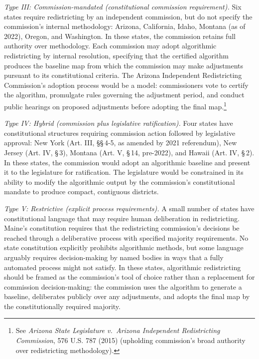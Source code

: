 \textit{Type III: Commission-mandated (constitutional commission requirement).} Six states require redistricting by an independent commission, but do not specify the commission's internal methodology: Arizona, California, Idaho, Montana (as of 2022), Oregon, and Washington. In these states, the commission retains full authority over methodology. Each commission may adopt algorithmic redistricting by internal resolution, specifying that the certified algorithm produces the baseline map from which the commission may make adjustments pursuant to its constitutional criteria. The Arizona Independent Redistricting Commission's adoption process would be a model: commissioners vote to certify the algorithm, promulgate rules governing the adjustment period, and conduct public hearings on proposed adjustments before adopting the final map.\footnote{See \textit{Arizona State Legislature v.\ Arizona Independent Redistricting Commission}, 576 U.S. 787 (2015) (upholding commission's broad authority over redistricting methodology).}

\textit{Type IV: Hybrid (commission plus legislative ratification).} Four states have constitutional structures requiring commission action followed by legislative approval: New York (Art. III, \S\S\,4-5, as amended by 2021 referendum), New Jersey (Art. IV, \S\,3), Montana (Art. V, \S\,14, pre-2022), and Hawaii (Art. IV, \S\,2). In these states, the commission would adopt an algorithmic baseline and present it to the legislature for ratification. The legislature would be constrained in its ability to modify the algorithmic output by the commission's constitutional mandate to produce compact, contiguous districts.

\textit{Type V: Restrictive (explicit process requirements).} A small number of states have constitutional language that may require human deliberation in redistricting. Maine's constitution requires that the redistricting commission's decisions be reached through a deliberative process with specified majority requirements. No state constitution explicitly prohibits algorithmic methods, but some language arguably requires decision-making by named bodies in ways that a fully automated process might not satisfy. In these states, algorithmic redistricting should be framed as the commission's tool of choice rather than a replacement for commission decision-making: the commission uses the algorithm to generate a baseline, deliberates publicly over any adjustments, and adopts the final map by the constitutionally required majority.

